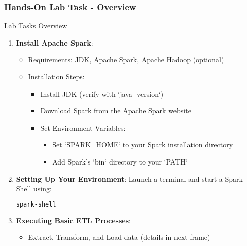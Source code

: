 \documentclass[aspectratio=169]{beamer}
\begin{document}
\begin{frame}[fragile]
    \frametitle{Hands-On Lab Task - Overview}
    \begin{block}{Lab Tasks Overview}
        \begin{enumerate}
            \item \textbf{Install Apache Spark}:
                \begin{itemize}
                    \item Requirements: JDK, Apache Spark, Apache Hadoop (optional)
                    \item Installation Steps:
                        \begin{itemize}
                            \item Install JDK (verify with `java -version`)
                            \item Download Spark from the \href{https://spark.apache.org/downloads.html}{Apache Spark website}
                            \item Set Environment Variables: 
                              \begin{itemize}
                                \item Set `SPARK_HOME` to your Spark installation directory
                                \item Add Spark’s `bin` directory to your `PATH`
                              \end{itemize}
                        \end{itemize}
                \end{itemize}
            \item \textbf{Setting Up Your Environment}: Launch a terminal and start a Spark Shell using:
                \begin{lstlisting}[language=bash]
spark-shell
                \end{lstlisting}
            \item \textbf{Executing Basic ETL Processes}:
                \begin{itemize}
                    \item Extract, Transform, and Load data (details in next frame)
                \end{itemize}
        \end{enumerate}
    \end{block}
\end{frame}
\end{document}
